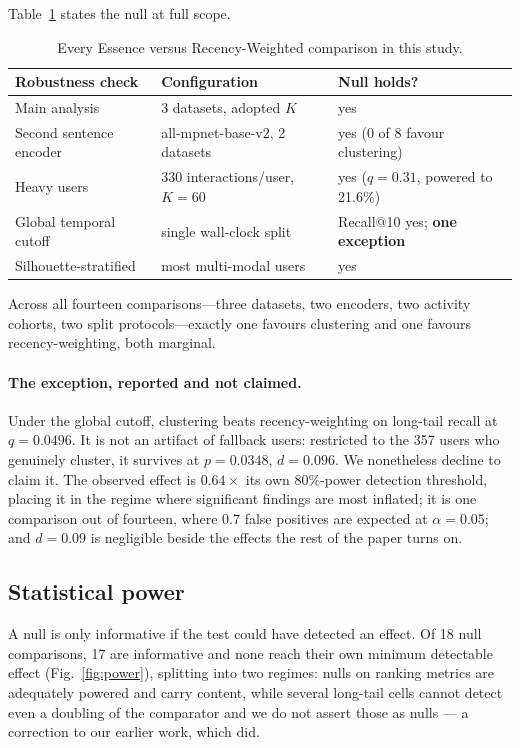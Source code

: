 \documentclass[runningheads,a4paper]{llncs}
\begin{document}
Table~\ref{tab:robust} states the null at full scope.

\begin{table}[tb]
\caption{Every Essence versus Recency-Weighted comparison in this study.}\label{tab:robust}
\centering
\small
\begin{tabular}{@{}llp{4.0cm}@{}}
\toprule
Robustness check & Configuration & Null holds? \\
\midrule
Main analysis & 3 datasets, adopted $K$ & yes \\
Second sentence encoder & all-mpnet-base-v2, 2 datasets & yes (0 of 8 favour clustering) \\
Heavy users & 330 interactions/user, $K=60$ & yes ($q=0.31$, powered to 21.6\%) \\
Global temporal cutoff & single wall-clock split & Recall@10 yes; \textbf{one exception} \\
Silhouette-stratified & most multi-modal users & yes \\
\bottomrule
\end{tabular}
\end{table}

Across all fourteen comparisons---three datasets, two encoders, two activity cohorts, two
split protocols---exactly one favours clustering and one favours recency-weighting, both
marginal.

\paragraph{The exception, reported and not claimed.} Under the global cutoff, clustering
beats recency-weighting on long-tail recall at $q=0.0496$. It is not an artifact of
fallback users: restricted to the 357 users who genuinely cluster, it survives at
$p=0.0348$, $d=0.096$. We nonetheless decline to claim it. The observed effect is
$0.64\times$ its own 80\%-power detection threshold, placing it in the regime where
significant findings are most inflated; it is one comparison out of fourteen, where 0.7
false positives are expected at $\alpha=0.05$; and $d=0.09$ is negligible beside the
effects the rest of the paper turns on.

\subsection{Statistical power}\label{sec:power}

A null is only informative if the test could have detected an effect. Of 18 null
comparisons, 17 are informative and none reach their own minimum detectable effect
(Fig.~\ref{fig:power}), splitting into two regimes: nulls on ranking metrics are adequately
powered and carry content, while several long-tail cells cannot detect even a doubling of
the comparator and we do not assert those as nulls --- a correction to our earlier work,
which did.
\end{document}
